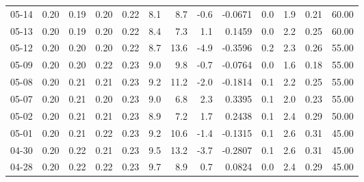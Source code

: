 \begin{threeparttable}
{\begin{tabular}{lrrrrrrrrrrrr}
  05-14 &          0.20 &          0.19 &          0.20 &        0.22 &                 8.1 &                 8.7 &       -0.6 &      -0.0671 &                 0.0 &              1.9 &            0.21 &                  60.00 \\
  05-13 &          0.20 &          0.19 &          0.20 &        0.22 &                 8.4 &                 7.3 &        1.1 &       0.1459 &                 0.0 &              2.2 &            0.25 &                  60.00 \\
  05-12 &          0.20 &          0.20 &          0.20 &        0.22 &                 8.7 &                13.6 &       -4.9 &      -0.3596 &                 0.2 &              2.3 &            0.26 &                  55.00 \\
  05-09 &          0.20 &          0.20 &          0.22 &        0.23 &                 9.0 &                 9.8 &       -0.7 &      -0.0764 &                 0.0 &              1.6 &            0.18 &                  55.00 \\
  05-08 &          0.20 &          0.21 &          0.21 &        0.23 &                 9.2 &                11.2 &       -2.0 &      -0.1814 &                 0.1 &              2.2 &            0.25 &                  55.00 \\
  05-07 &          0.20 &          0.21 &          0.20 &        0.23 &                 9.0 &                 6.8 &        2.3 &       0.3395 &                 0.1 &              2.0 &            0.23 &                  55.00 \\
  05-02 &          0.20 &          0.21 &          0.21 &        0.23 &                 8.9 &                 7.2 &        1.7 &       0.2438 &                 0.1 &              2.4 &            0.29 &                  50.00 \\
  05-01 &          0.20 &          0.21 &          0.22 &        0.23 &                 9.2 &                10.6 &       -1.4 &      -0.1315 &                 0.1 &              2.6 &            0.31 &                  45.00 \\
  04-30 &          0.20 &          0.22 &          0.21 &        0.23 &                 9.5 &                13.2 &       -3.7 &      -0.2807 &                 0.1 &              2.6 &            0.31 &                  45.00 \\
  04-28 &          0.20 &          0.22 &          0.22 &        0.23 &                 9.7 &                 8.9 &        0.7 &       0.0824 &                 0.0 &              2.4 &            0.29 &                  45.00 \\

\end{tabular}}
\end{threeparttable}
